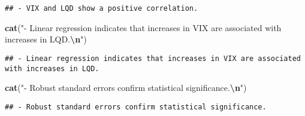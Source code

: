 \documentclass[
]{article}
\newenvironment{Shaded}{\begin{snugshade}}{\end{snugshade}}
\newcommand{\FunctionTok}[1]{\textcolor[rgb]{0.13,0.29,0.53}{\textbf{#1}}}
\newcommand{\NormalTok}[1]{#1}
\newcommand{\SpecialCharTok}[1]{\textcolor[rgb]{0.81,0.36,0.00}{\textbf{#1}}}
\newcommand{\StringTok}[1]{\textcolor[rgb]{0.31,0.60,0.02}{#1}}
\begin{document}
\begin{verbatim}
## - VIX and LQD show a positive correlation.
\end{verbatim}

\begin{Shaded}
\begin{Highlighting}[]
\FunctionTok{cat}\NormalTok{(}\StringTok{"{-} Linear regression indicates that increases in VIX are associated with increases in LQD.}\SpecialCharTok{\textbackslash{}n}\StringTok{"}\NormalTok{)}
\end{Highlighting}
\end{Shaded}

\begin{verbatim}
## - Linear regression indicates that increases in VIX are associated with increases in LQD.
\end{verbatim}

\begin{Shaded}
\begin{Highlighting}[]
\FunctionTok{cat}\NormalTok{(}\StringTok{"{-} Robust standard errors confirm statistical significance.}\SpecialCharTok{\textbackslash{}n}\StringTok{"}\NormalTok{)}
\end{Highlighting}
\end{Shaded}

\begin{verbatim}
## - Robust standard errors confirm statistical significance.
\end{verbatim}
\end{document}
